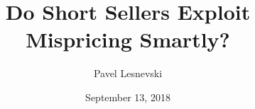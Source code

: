 \documentclass{beamer}
\title[]{ \textbf{Do Short Sellers Exploit Mispricing Smartly?}}  %
\author[Pavel Lesnevski]{Pavel Lesnevski }
\institute[University of Mannheim]{University of Mannheim}
\date{September 13, 2018} %
\begin{document}
\begin{frame}
\titlepage %
\end{frame}


\end{document}
